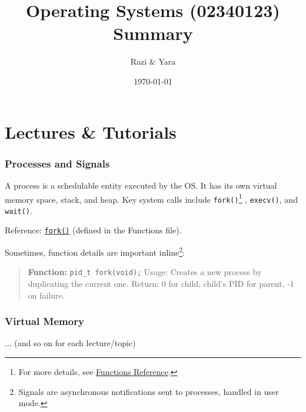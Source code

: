 \documentclass[12pt]{article}
\title{Operating Systems (02340123)\\ Summary}
\author{Razi \& Yara}
\date{\today}
\begin{document}
\maketitle
\tableofcontents
\newpage




\part{Lectures \& Tutorials}
\section{Processes and Signals}
A process is a schedulable entity executed by the OS. It has its own virtual memory space, stack, and heap. Key system calls include \texttt{fork()}\footnote{For more details, see \hyperref[func:fork]{Functions Reference}.} , \texttt{execv()}, and \texttt{wait()}.

Reference: \hyperref[func:fork]{\texttt{fork()}} (defined in the Functions file).

Sometimes, function details are important inline\footnote{Signals are asynchronous notifications sent to processes, handled in user mode.}:
\begin{quote}
    \textbf{Function:} \texttt{pid\_t fork(void);}
    \newline
    Usage: Creates a new process by duplicating the current one.
    \newline
    Return: 0 for child, child's PID for parent, -1 on failure.
\end{quote}

\section{Virtual Memory}
... (and so on for each lecture/topic)
\end{document}
